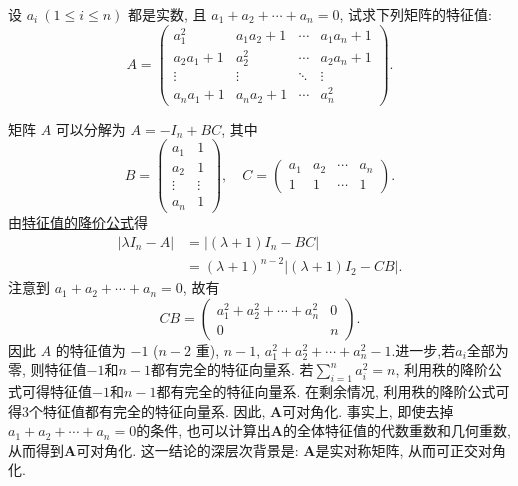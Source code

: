\documentclass[../../main.tex]{subfiles}%
\begin{document}
\begin{example}
设 $a_i \ (1 \leqslant  i \leqslant  n)$ 都是实数, 且 $a_1 + a_2 + \cdots + a_n = 0$, 试求下列矩阵的特征值:
\[
A = 
\begin{pmatrix}
a_1^2 & a_1 a_2 + 1 & \cdots & a_1 a_n + 1 \\
a_2 a_1 + 1 & a_2^2 & \cdots & a_2 a_n + 1 \\
\vdots & \vdots & \ddots & \vdots \\
a_n a_1 + 1 & a_n a_2 + 1 & \cdots & a_n^2
\end{pmatrix}.
\]
\end{example}
\begin{solution}

矩阵 $A$ 可以分解为 $A = -I_n + BC$, 其中
\[
B = 
\begin{pmatrix}
a_1 & 1 \\
a_2 & 1 \\
\vdots & \vdots \\
a_n & 1
\end{pmatrix}, \quad
C = 
\begin{pmatrix}
a_1 & a_2 & \cdots & a_n \\
1 & 1 & \cdots & 1
\end{pmatrix}.
\]
由\hyperref[theorem:特征值的降价公式]{特征值的降价公式}得
\begin{align*}
| \lambda I_n - A | 
&= | (\lambda + 1) I_n - BC | \\
&= (\lambda + 1)^{n-2} | (\lambda + 1) I_2 - CB |.
\end{align*}
注意到 $a_1 + a_2 + \cdots + a_n = 0$, 故有
\[
CB = 
\begin{pmatrix}
a_1^2 + a_2^2 + \cdots + a_n^2 & 0 \\
0 & n
\end{pmatrix}.
\]
因此 $A$ 的特征值为 $-1$ ($n-2$ 重), $n-1$, $a_1^2 + a_2^2 + \cdots + a_n^2 - 1$.进一步,若\(a_i\)全部为零, 则特征值\(-1\)和\(n - 1\)都有完全的特征向量系. 若\(\sum_{i = 1}^{n}a_i^2 = n\), 利用秩的降阶公式可得特征值\(-1\)和\(n - 1\)都有完全的特征向量系. 在剩余情况, 利用秩的降阶公式可得\(3\)个特征值都有完全的特征向量系. 因此, \(\boldsymbol{A}\)可对角化. 事实上, 即使去掉\(a_1 + a_2+\cdots + a_n = 0\)的条件, 也可以计算出\(\boldsymbol{A}\)的全体特征值的代数重数和几何重数, 从而得到\(\boldsymbol{A}\)可对角化. 这一结论的深层次背景是: \(\boldsymbol{A}\)是实对称矩阵, 从而可正交对角化.

\end{solution}
\end{document}
